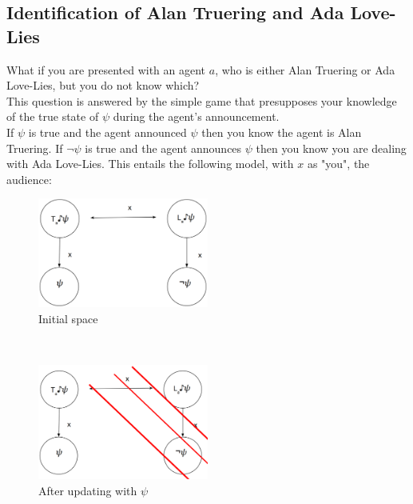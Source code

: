 \documentclass[12pt, titlepage, twoside, a4paper]{report}
\begin{document}
{\subsection{Identification of Alan Truering and Ada Love-Lies}
What if you are presented with an agent $a$, who is either Alan Truering or Ada Love-Lies, but you do not know which?\\
This question is answered by the simple game that presupposes your knowledge of the true state of $\psi$ during the agent's announcement.\\
If $\psi$ is true and the agent announced $\psi$ then you know the agent is Alan Truering. If $\neg \psi$ is true and the agent announces $\psi$ then you know you are dealing with Ada Love-Lies.
This entails the following model, with $x$ as "you", the audience:
\begin{figure}[h!]
  \centering
  \includegraphics[width=0.5\textwidth]{slide10.eps}
  \caption{Initial space}
\end{figure}\\
\begin{figure}[h!]
  \centering
  \includegraphics[width=0.5\textwidth]{slide11.eps}
  \caption{After updating with $\psi$}
\end{figure}

}
\end{document}
